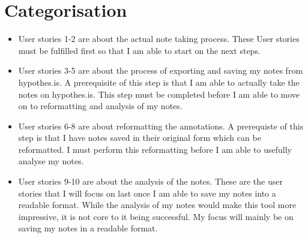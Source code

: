\documentclass{article}
\begin{document}
\section{Categorisation}
\begin{itemize}
\item User stories 1-2 are about the actual note taking process. These User stories must be fulfilled first so that I am able to start on the next steps.  
\item User stories 3-5 are about the process of exporting and saving my notes from hypothes.is. A prerequisite of this step is that I am able to actually take the notes on hypothes.is. This step must be completed before I am able to move on to reformatting and analysis of my notes. 
\item User stories 6-8 are about reformatting the annotations. A prerequiste of this step is that I have notes saved in their original form which can be reformatted. I must perform this reformatting before I am able to usefully analyse my notes. 
\item User stories 9-10 are about the analysis of the notes. These are the user stories that I will focus on last once I am able to save my notes into a readable format. While the analysis of my notes would make this tool more impressive, it is not core to it being successful. My focus will mainly be on saving my notes in a readable format. 
\end{itemize}
\end{document}
